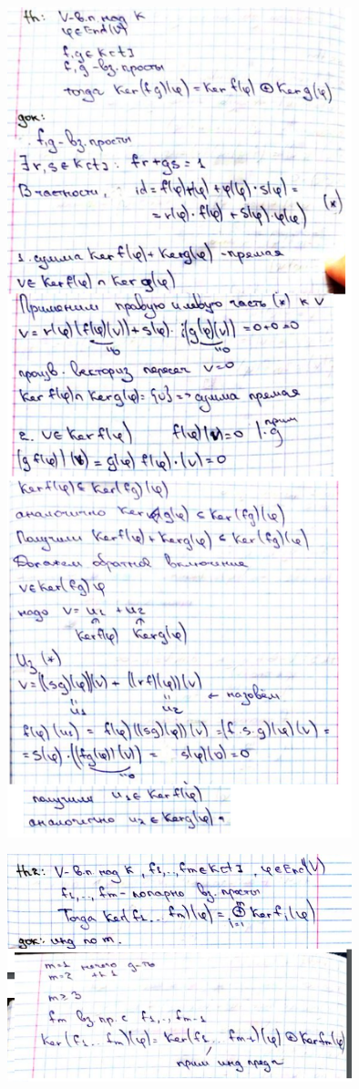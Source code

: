\documentclass[algebra]{subfiles}
\begin{document}
    \begin{figure}[H]
            \includegraphics[width=10cm]{pics/57_1}
            \centering
    \end{figure}
    \begin{figure}[H]
            \includegraphics[width=10cm]{pics/57_2}
            \centering
    \end{figure}
\end{document}
